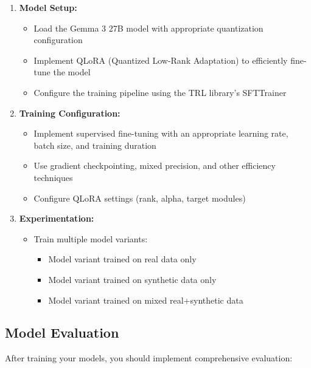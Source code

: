 \documentclass[11pt]{article}
\begin{document}
\begin{enumerate}
    \item \textbf{Model Setup:}
    \begin{itemize}
        \item Load the Gemma 3 27B model with appropriate quantization configuration
        \item Implement QLoRA (Quantized Low-Rank Adaptation) to efficiently fine-tune the model
        \item Configure the training pipeline using the TRL library's SFTTrainer
    \end{itemize}
    
    \item \textbf{Training Configuration:}
    \begin{itemize}
        \item Implement supervised fine-tuning with an appropriate learning rate, batch size, and training duration
        \item Use gradient checkpointing, mixed precision, and other efficiency techniques
        \item Configure QLoRA settings (rank, alpha, target modules)
    \end{itemize}
    
    \item \textbf{Experimentation:}
    \begin{itemize}
        \item Train multiple model variants:
        \begin{itemize}
            \item Model variant trained on real data only
            \item Model variant trained on synthetic data only
            \item Model variant trained on mixed real+synthetic data
        \end{itemize}
    \end{itemize}
\end{enumerate}

\subsection{Model Evaluation}

After training your models, you should implement comprehensive evaluation:
\end{document}
